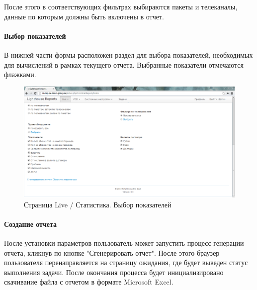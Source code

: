 После этого в соответствующих фильтрах выбираются пакеты и телеканалы, 
данные по которым должны быть включены в отчет.

\paragraph{Выбор показателей}
В нижней части формы расположен раздел для выбора показателей,
необходимых для вычислений в рамках текущего отчета.
Выбранные показатели отмечаются флажками.

\begin{figure}[!ht]
\begin{center}
\hspace*{-1cm} \includegraphics[scale=0.35, trim=0mm 0mm 100mm 10mm, clip]{../resources/screens/live_stat_indicators.png}
\caption{Страница Live / Статистика. Выбор показателей}
\end{center}
\end{figure}

\paragraph{Создание отчета}
После установки параметров пользователь может запустить процесс
генерации отчета, кликнув по кнопке "Сгенерировать отчет".
После этого браузер пользователя перенаправляется на страницу ожидания,
где будет выведен статус выполнения задачи. После окончания процесса
будет инициализировано скачивание файла с отчетом в формате Microsoft Excel.

